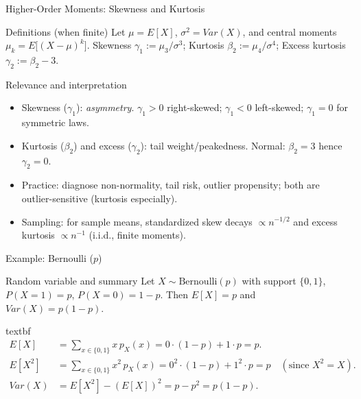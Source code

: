 \documentclass[aspectratio=43]{beamer}
\def\P{P}%
\def\E{E}%
\def\Var{Var}%
\def\mathbb#1{#1}%
\renewcommand{\P}{\mathbb{P}}
\newcommand{\E}{\mathbb{E}}
\newcommand{\Var}{\operatorname{Var}}
\newcommand{\1}{\mathbf{1}}
\newcommand{\robustcmd}[1]{\csname #1\endcsname}
\providecommand{\textbf}[1]{\robustcmd{textbf}{#1}}
\begin{document}
\begin{frame}{Higher-Order Moments: Skewness and Kurtosis}{}
  {\footnotesize
  \begin{block}{Definitions (when finite)}
    Let $\mu=\E[X]$, $\sigma^2=\Var(X)$, and central moments $\mu_k=\E\big[(X-\mu)^k\big]$. Skewness $\gamma_1:=\mu_3/\sigma^3$; Kurtosis $\beta_2:=\mu_4/\sigma^4$; Excess kurtosis $\gamma_2:=\beta_2-3$.
  \end{block}
  \vspace{-0.4em}
  \begin{block}{Relevance and interpretation}
    \begin{itemize}\setlength{\itemsep}{0.15em}
      \item Skewness ($\gamma_1$): \emph{asymmetry}. $\gamma_1>0$ right-skewed; $\gamma_1<0$ left-skewed; $\gamma_1=0$ for symmetric laws.
      \item Kurtosis ($\beta_2$) and excess ($\gamma_2$): tail weight/peakedness. Normal: $\beta_2=3$ hence $\gamma_2=0$.
      \item Practice: diagnose non-normality, tail risk, outlier propensity; both are outlier-sensitive (kurtosis especially).
      \item Sampling: for sample means, standardized skew decays $\propto n^{-1/2}$ and excess kurtosis $\propto n^{-1}$ (i.i.d., finite moments).
    \end{itemize}
  \end{block}
  }
\end{frame}

\begin{frame}{Example: Bernoulli (\texorpdfstring{$p$}{p})}
  \begin{block}{Random variable and summary}
    Let $X\sim\mathrm{Bernoulli}(p)$ with support $\{0,1\}$, $\P(X=1)=p$, $\P(X=0)=1-p$. Then $\E[X]=p$ and $\Var(X)=p(1-p)$.
  \end{block}
  \vspace{0.3em}
  	\textbf{Computation.}
  \begin{align*}
    \E[X] &= \sum_{x\in\{0,1\}} x\, p_X(x) = 0\cdot(1-p) + 1\cdot p = p. \\
    \E[X^2] &= \sum_{x\in\{0,1\}} x^2\, p_X(x) = 0^2\cdot(1-p) + 1^2\cdot p = p \quad (\text{since } X^2=X). \\
    \Var(X) &= \E[X^2] - (\E[X])^2 = p - p^2 = p(1-p).
  \end{align*}
\end{frame}
\end{document}
